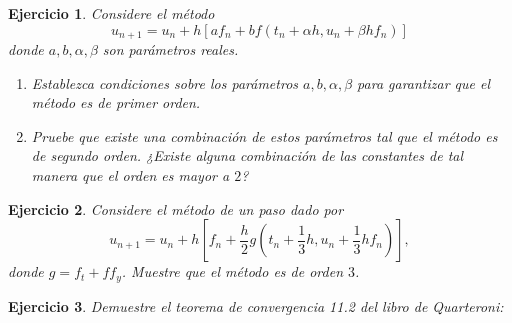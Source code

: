 \documentclass[11pt]{article}
\newtheorem{exercise}{Ejercicio}
\begin{document}
\begin{exercise}
  Considere el método
  \begin{equation}
    u_{n+1} = u_n + h[af_n + bf(t_n+\alpha h,u_n+\beta h f_n)]
  \end{equation}
  donde $a,b,\alpha,\beta$ son parámetros reales.
  \begin{enumerate}
    \item
      Establezca condiciones sobre los parámetros $a,b,\alpha,\beta$ 
      para garantizar que el método es de primer orden.
    \item
      Pruebe que existe una combinación de estos parámetros tal que el
      método es de segundo orden. ¿Existe alguna combinación de las
      constantes de tal manera que el orden es mayor a $2$?
  \end{enumerate}
\end{exercise}

\begin{exercise}
  Considere el método de un paso dado por
  \begin{equation}
    u_{n+1} = u_n + h \left[
      f_n + \frac{h}{2}g \left(
        t_n + \frac{1}{3}h,
        u_n + \frac{1}{3}hf_n
      \right)
    \right]
  ,\end{equation}
  donde $g=f_t+ff_y$. Muestre que el método es de orden $3$.
\end{exercise}

\begin{exercise}
  Demuestre el teorema de convergencia 11.2 del libro de Quarteroni:
\end{exercise}
\end{document}
